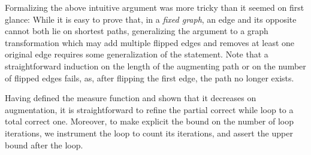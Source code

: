\documentclass[smallcondensed]{svjour3}     %
\begin{document}
  Formalizing the above intuitive argument was more tricky than it seemed on first glance:
  While it is easy to prove that, in a \emph{fixed graph}, an edge and its opposite cannot both lie on shortest paths, generalizing the argument
  to a graph transformation which may add multiple flipped edges and removes at least one original edge requires some generalization of the statement.
  Note that a straightforward induction on the length of the augmenting path or on the number of flipped edges fails, as, after flipping the first 
  edge, the path no longer exists.
  
%   
%   
%   
  
  Having defined the measure function and shown that it decreases on augmentation, it is straightforward to refine the partial correct while loop to a total correct one. Moreover, to make explicit the bound on the number of loop iterations, we instrument the loop to count its iterations, and assert the upper bound after the loop.
\end{document}
